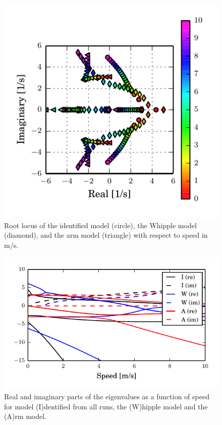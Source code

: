 \documentclass[a4paper]{article}
\begin{document}
\begin{figure}
  \includegraphics[width=5in]{figures/L-P-rlocus.pdf}
  \caption{Root locus of the identified model (circle), the Whipple model
    (diamond), and the arm model (triangle) with respect to speed in m/s.
    }
\end{figure}

\begin{figure}
  \includegraphics[width=5in]{figures/L-P-eig.pdf}
  \caption{Real and imaginary parts of the eigenvalues as a function of speed
    for model (I)dentified from all runs, the (W)hipple model and the (A)rm
  model.}
\end{figure}
\end{document}
